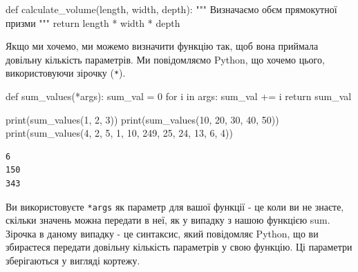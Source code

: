 \documentclass[
  letterpaper,
]{report}
\newenvironment{Shaded}{\begin{snugshade}}{\end{snugshade}}
\newcommand{\BuiltInTok}[1]{\textcolor[rgb]{0.00,0.23,0.31}{#1}}
\newcommand{\CommentTok}[1]{\textcolor[rgb]{0.37,0.37,0.37}{#1}}
\newcommand{\ControlFlowTok}[1]{\textcolor[rgb]{0.00,0.23,0.31}{#1}}
\newcommand{\DecValTok}[1]{\textcolor[rgb]{0.68,0.00,0.00}{#1}}
\newcommand{\KeywordTok}[1]{\textcolor[rgb]{0.00,0.23,0.31}{#1}}
\newcommand{\NormalTok}[1]{\textcolor[rgb]{0.00,0.23,0.31}{#1}}
\newcommand{\OperatorTok}[1]{\textcolor[rgb]{0.37,0.37,0.37}{#1}}
\begin{document}
\begin{Shaded}
\begin{Highlighting}[]
\KeywordTok{def}\NormalTok{ calculate\_volume(length, width, depth):}
    \CommentTok{""" Визначаємо об\textquotesingle{}єм прямокутної призми """}
    \ControlFlowTok{return}\NormalTok{ length }\OperatorTok{*}\NormalTok{ width }\OperatorTok{*}\NormalTok{ depth}
\end{Highlighting}
\end{Shaded}

Якщо ми хочемо, ми можемо визначити функцію так, щоб вона приймала
довільну кількість параметрів. Ми повідомляємо Python, що хочемо цього,
використовуючи зірочку (\texttt{*}).

\begin{Shaded}
\begin{Highlighting}[]
\KeywordTok{def}\NormalTok{ sum\_values(}\OperatorTok{*}\NormalTok{args):}
\NormalTok{    sum\_val }\OperatorTok{=} \DecValTok{0}
    \ControlFlowTok{for}\NormalTok{ i }\KeywordTok{in}\NormalTok{ args:}
\NormalTok{        sum\_val }\OperatorTok{+=}\NormalTok{ i}
    \ControlFlowTok{return}\NormalTok{ sum\_val}
\end{Highlighting}
\end{Shaded}

\begin{Shaded}
\begin{Highlighting}[]
\BuiltInTok{print}\NormalTok{(sum\_values(}\DecValTok{1}\NormalTok{, }\DecValTok{2}\NormalTok{, }\DecValTok{3}\NormalTok{))}
\BuiltInTok{print}\NormalTok{(sum\_values(}\DecValTok{10}\NormalTok{, }\DecValTok{20}\NormalTok{, }\DecValTok{30}\NormalTok{, }\DecValTok{40}\NormalTok{, }\DecValTok{50}\NormalTok{))}
\BuiltInTok{print}\NormalTok{(sum\_values(}\DecValTok{4}\NormalTok{, }\DecValTok{2}\NormalTok{, }\DecValTok{5}\NormalTok{, }\DecValTok{1}\NormalTok{, }\DecValTok{10}\NormalTok{, }\DecValTok{249}\NormalTok{, }\DecValTok{25}\NormalTok{, }\DecValTok{24}\NormalTok{, }\DecValTok{13}\NormalTok{, }\DecValTok{6}\NormalTok{, }\DecValTok{4}\NormalTok{))}
\end{Highlighting}
\end{Shaded}

\begin{verbatim}
6
150
343
\end{verbatim}

Ви використовуєте \texttt{*args} як параметр для вашої функції - це коли
ви не знаєте, скільки значень можна передати в неї, як у випадку з нашою
функцією sum. Зірочка в даному випадку - це синтаксис, який повідомляє
Python, що ви збираєтеся передати довільну кількість параметрів у свою
функцію. Ці параметри зберігаються у вигляді кортежу.
\end{document}
